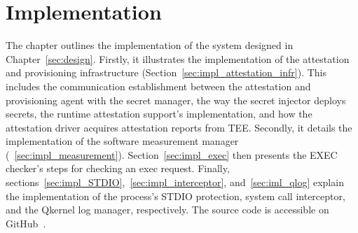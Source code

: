 \chapter{Implementation}
\label{sec:implementation}



The chapter outlines the implementation of the system designed in Chapter~\ref{sec:design}. Firstly, it illustrates the implementation of the attestation and provisioning infrastructure (Section~\ref{sec:impl_attestation_infr}). This includes the communication establishment between the 
attestation and provisioning agent with the secret manager, the way the secret injector deploys secrets, the runtime attestation support's implementation, and how the attestation driver acquires attestation reports from \acrshort{TEE}. Secondly, it details the implementation of the 
software measurement manager (~\ref{sec:impl_measurement}). Section~\ref{sec:impl_exec} then presents the EXEC checker's steps for checking an exec request. Finally, sections~\ref{sec:impl_STDIO},~\ref{sec:impl_interceptor}, and~\ref{sec:iml_qlog} explain the implementation of the process's STDIO 
protection, system call interceptor, and the Qkernel log manager, respectively. The source code is accessible on GitHub~\cite*{theis_source_code}.

